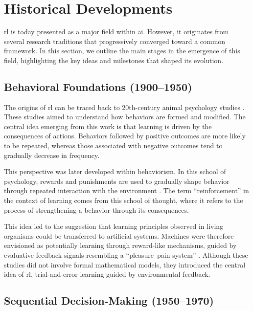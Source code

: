 \section{Historical Developments}
\label{sec:reinforcement_learning_historical_developments}

\gls{rl} is today presented as a major field within \gls{ai}.
However, it originates from several research traditions that progressively converged toward a common framework.  
In this section, we outline the main stages in the emergence of this field, highlighting the key ideas and milestones that shaped its evolution.

\subsection{Behavioral Foundations (1900--1950)}

The origins of \gls{rl} can be traced back to 20th-century animal psychology studies \parencite{thorndike1911law}.
These studies aimed to understand how behaviors are formed and modified.
The central idea emerging from this work is that learning is driven by the consequences of actions.
Behaviors followed by positive outcomes are more likely to be repeated, whereas those associated with negative outcomes tend to gradually decrease in frequency.

This perspective was later developed within behaviorism.  
In this school of psychology, rewards and punishments are used to gradually shape behavior through repeated interaction with the environment \parencite{skinner1938behavior}.
The term \enquote{reinforcement} in the context of learning comes from this school of thought, where it refers to the process of strengthening a behavior through its consequences.

This idea led to the suggestion that learning principles observed in living organisms could be transferred to artificial systems.
Machines were therefore envisioned as potentially learning through reward-like mechanisms, guided by evaluative feedback signals resembling a \enquote{pleasure--pain system} \parencite{turing1948intelligent}.
Although these studies did not involve formal mathematical models, they introduced the central idea of \gls{rl}, trial-and-error learning guided by environmental feedback.

\subsection{Sequential Decision-Making (1950--1970)}

